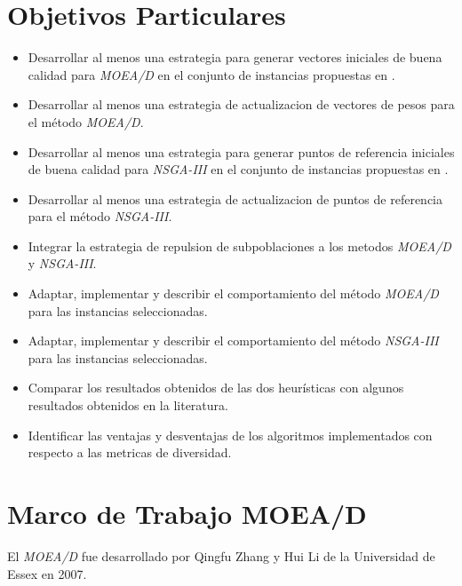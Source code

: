 \documentclass[letterpaper,10pt]{article}
\begin{document}
\section{Objetivos Particulares}

\begin{itemize}
\item Desarrollar al menos una estrategia para generar vectores iniciales de buena calidad para \emph{MOEA/D} en el conjunto de instancias propuestas en \cite{zhang2008multiobjective}.

\item Desarrollar al menos una estrategia de actualizacion de vectores de pesos para el método \emph{MOEA/D}.

\item Desarrollar al menos una estrategia para generar puntos de referencia iniciales de buena calidad para \emph{NSGA-III} en el conjunto de instancias propuestas en \cite{zhang2008multiobjective}.

\item Desarrollar al menos una estrategia de actualizacion de puntos de referencia para el método \emph{NSGA-III}.

\item Integrar la estrategia de repulsion de subpoblaciones\cite{ahrari2016multimodal} a los metodos \emph{MOEA/D} y \emph{NSGA-III}.

\item Adaptar, implementar y describir el comportamiento del método \emph{MOEA/D} para las instancias seleccionadas.
 
\item Adaptar, implementar y describir el comportamiento del método \emph{NSGA-III} para las instancias seleccionadas.

\item Comparar los resultados obtenidos de las dos heurísticas con algunos resultados obtenidos en la literatura.

\item Identificar las ventajas y desventajas de los algoritmos implementados con respecto a las metricas de diversidad.
\end{itemize}

\section{Marco de Trabajo MOEA/D}
El \emph{MOEA/D} fue desarrollado por Qingfu Zhang y Hui Li de la Universidad de Essex en 2007. \cite{4358754}
 
\end{document}
